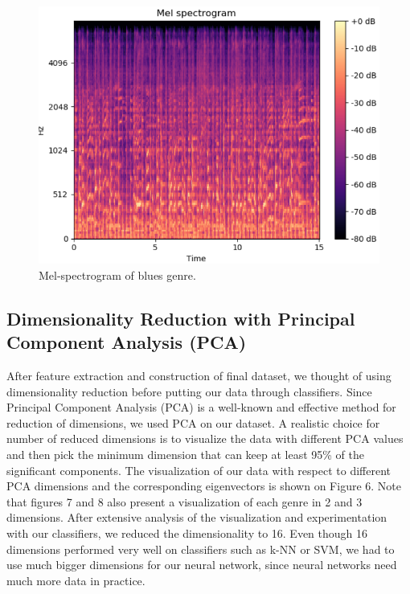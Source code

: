 \begin{figure}
\begin{center}
\includegraphics[scale=0.2]{./figures/blues.png}
\end{center}
\caption
{
Mel-spectrogram of blues genre. 
}
\label{fig:big_picture5}
\end{figure}

\subsection{Dimensionality Reduction with Principal Component Analysis (PCA)}
After feature extraction and construction of final dataset, we thought of using dimensionality reduction before putting our data through classifiers. Since Principal Component Analysis (PCA) is a well-known and effective method for reduction of dimensions, we used PCA on our dataset. A realistic choice for number of reduced dimensions is to visualize the data with different PCA values and then pick the minimum dimension that can keep at least 95\% of the significant components. The visualization of our data with respect to different PCA dimensions and the corresponding eigenvectors is shown on Figure 6. Note that figures 7 and 8 also present a visualization of each genre in 2 and 3 dimensions. After extensive analysis of the visualization and experimentation with our classifiers, we reduced the dimensionality to 16. Even though 16 dimensions performed very well on classifiers such as k-NN or SVM, we had to use much bigger dimensions for our neural network, since neural networks need much more data in practice. 

